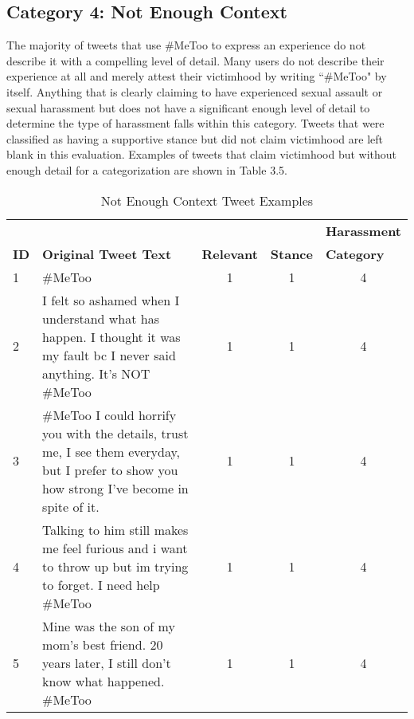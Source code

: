 \subsection{Category 4: Not Enough Context}

The majority of tweets that use \#MeToo to express an experience do not describe it with a compelling level of detail. Many users do not describe their experience at all and merely attest their victimhood by writing ``\#MeToo" by itself. Anything that is clearly claiming to have experienced sexual assault or sexual harassment but does not have a significant enough level of detail to determine the type of harassment falls within this category. Tweets that were classified as having a supportive stance but did not claim victimhood are left blank in this evaluation. Examples of tweets that claim victimhood but without enough detail for a categorization are shown in Table 3.5.

\begin{table}[H]
    \centering
    \caption{Not Enough Context Tweet Examples}
    \begin{tabular}{m{1cm} m{8cm} m{1.5cm} m{1.1cm} m{2.1cm}}
        \toprule
        & {} & {} & {} & {\textbf{Harassment}} \\
        \rowcolor{White}\textbf{ID} & {\textbf{Original Tweet Text}} & {\textbf{Relevant}} & {\textbf{Stance}} & {\textbf{Category}} \\
                \midrule
        1 & \#MeToo & \multicolumn{1}{c}{1} & \multicolumn{1}{c}{1} & \multicolumn{1}{c}{4}\\
        2 & I felt so ashamed when I understand what has happen. I thought it was my fault bc I never said anything. It's NOT \#MeToo & \multicolumn{1}{c}{1} & \multicolumn{1}{c}{1} & \multicolumn{1}{c}{4}\\
        3 & \#MeToo I could horrify you with the details, trust me, I see them everyday, but I prefer to show you how strong I've become in spite of it. & \multicolumn{1}{c}{1} & \multicolumn{1}{c}{1} & \multicolumn{1}{c}{4}\\
        4 & Talking to him still makes me feel furious and i want to throw up but im trying to forget. I need help \#MeToo & \multicolumn{1}{c}{1} & \multicolumn{1}{c}{1} & \multicolumn{1}{c}{4}\\
        5 & Mine was the son of my mom's best friend. 20 years later, I still don't know what happened. \#MeToo & \multicolumn{1}{c}{1} & \multicolumn{1}{c}{1} & \multicolumn{1}{c}{4}\\
        \bottomrule
    \end{tabular}
\end{table}

